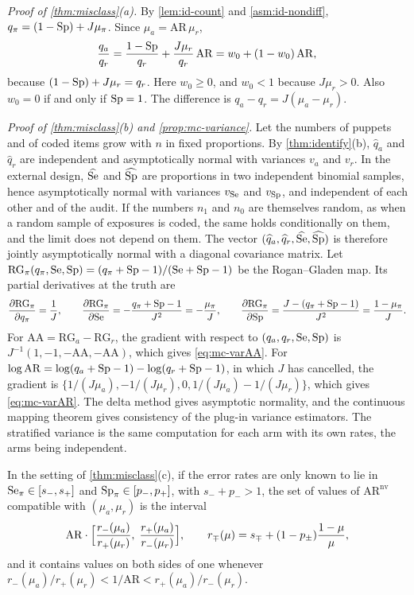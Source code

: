 \emph{Proof of \cref{thm:misclass}(a).} By \cref{lem:id-count} and \cref{asm:id-nondiff}, $q_\pi=(1-\mathrm{Sp})+J\mu_\pi$. Since $\mu_a=\mathrm{AR}\,\mu_r$,
\[
  \frac{q_a}{q_r}=\frac{1-\mathrm{Sp}}{q_r}+\frac{J\mu_r}{q_r}\,\mathrm{AR}=w_0+(1-w_0)\,\mathrm{AR},
\]
because $(1-\mathrm{Sp})+J\mu_r=q_r$. Here $w_0\ge0$, and $w_0<1$ because $J\mu_r>0$. Also $w_0=0$ if and only if $\mathrm{Sp}=1$. The difference is $q_a-q_r=J(\mu_a-\mu_r)$.

\emph{Proof of \cref{thm:misclass}(b) and \cref{prop:mc-variance}.} Let the numbers of puppets and of coded items grow with $n$ in fixed proportions. By \cref{thm:identify}(b), $\widehat q_a$ and $\widehat q_r$ are independent and asymptotically normal with variances $v_a$ and $v_r$. In the external design, $\widehat{\mathrm{Se}}$ and $\widehat{\mathrm{Sp}}$ are proportions in two independent binomial samples, hence asymptotically normal with variances $v_{\mathrm{Se}}$ and $v_{\mathrm{Sp}}$, and independent of each other and of the audit. If the numbers $n_1$ and $n_0$ are themselves random, as when a random sample of exposures is coded, the same holds conditionally on them, and the limit does not depend on them. The vector $(\widehat q_a,\widehat q_r,\widehat{\mathrm{Se}},\widehat{\mathrm{Sp}})$ is therefore jointly asymptotically normal with a diagonal covariance matrix. Let $\mathrm{RG}_\pi(q_\pi,\mathrm{Se},\mathrm{Sp})=(q_\pi+\mathrm{Sp}-1)/(\mathrm{Se}+\mathrm{Sp}-1)$ be the Rogan--Gladen map. Its partial derivatives at the truth are
\[
  \frac{\partial\mathrm{RG}_\pi}{\partial q_\pi}=\frac1J,\qquad
  \frac{\partial\mathrm{RG}_\pi}{\partial\mathrm{Se}}=-\frac{q_\pi+\mathrm{Sp}-1}{J^2}=-\frac{\mu_\pi}{J},\qquad
  \frac{\partial\mathrm{RG}_\pi}{\partial\mathrm{Sp}}=\frac{J-(q_\pi+\mathrm{Sp}-1)}{J^2}=\frac{1-\mu_\pi}{J}.
\]
For $\mathrm{AA}=\mathrm{RG}_a-\mathrm{RG}_r$, the gradient with respect to $(q_a,q_r,\mathrm{Se},\mathrm{Sp})$ is $J^{-1}(1,-1,-\mathrm{AA},-\mathrm{AA})$, which gives \eqref{eq:mc-varAA}. For $\log\mathrm{AR}=\log(q_a+\mathrm{Sp}-1)-\log(q_r+\mathrm{Sp}-1)$, in which $J$ has cancelled, the gradient is $\{1/(J\mu_a),-1/(J\mu_r),0,1/(J\mu_a)-1/(J\mu_r)\}$, which gives \eqref{eq:mc-varAR}. The delta method gives asymptotic normality, and the continuous mapping theorem gives consistency of the plug-in variance estimators. The stratified variance is the same computation for each arm with its own rates, the arms being independent.

\begin{lemma}\label{lem:mc-range}
In the setting of \cref{thm:misclass}(c), if the error rates are only known to lie in $\mathrm{Se}_\pi\in[s_-,s_+]$ and $\mathrm{Sp}_\pi\in[p_-,p_+]$, with $s_-+p_->1$, the set of values of $\mathrm{AR}^{\mathrm{nv}}$ compatible with $(\mu_a,\mu_r)$ is the interval
\[
  \mathrm{AR}\cdot\Bigl[\frac{r_-(\mu_a)}{r_+(\mu_r)},\;\frac{r_+(\mu_a)}{r_-(\mu_r)}\Bigr],\qquad
  r_\mp(\mu)=s_\mp+(1-p_\pm)\frac{1-\mu}{\mu},
\]
and it contains values on both sides of one whenever $r_-(\mu_a)/r_+(\mu_r)<1/\mathrm{AR}<r_+(\mu_a)/r_-(\mu_r)$.
\end{lemma}

